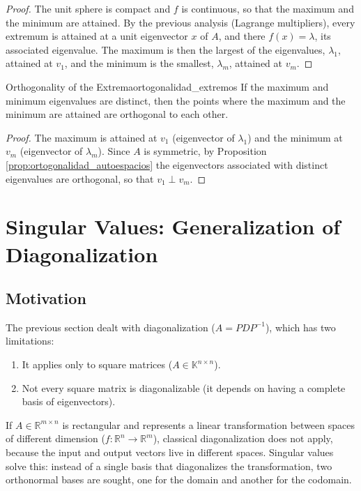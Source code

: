 \documentclass[11pt, a4paper]{article}
\begin{document}
\begin{proof}
The unit sphere is compact and $f$ is continuous, so that the maximum and the minimum are attained. By the previous analysis (Lagrange multipliers), every extremum is attained at a unit eigenvector $x$ of $A$, and there $f(x) = \lambda$, its associated eigenvalue. The maximum is then the largest of the eigenvalues, $\lambda_1$, attained at $v_1$, and the minimum is the smallest, $\lambda_m$, attained at $v_m$.
\end{proof}

\begin{corolario}{Orthogonality of the Extrema}{ortogonalidad_extremos}
If the maximum and minimum eigenvalues are distinct, then the points where the maximum and the minimum are attained are orthogonal to each other.
\end{corolario}

\begin{proof}
The maximum is attained at $v_1$ (eigenvector of $\lambda_1$) and the minimum at $v_m$ (eigenvector of $\lambda_m$). Since $A$ is symmetric, by Proposition \ref{prop:ortogonalidad_autoespacios} the eigenvectors associated with distinct eigenvalues are orthogonal, so that $v_1 \perp v_m$.
\end{proof}

\newpage

\section{Singular Values: Generalization of Diagonalization}

\subsection{Motivation}

The previous section dealt with diagonalization ($A = P D P^{-1}$), which has two limitations:
\begin{enumerate}
    \item It applies only to square matrices ($A \in \mathbb{K}^{n \times n}$).
    \item Not every square matrix is diagonalizable (it depends on having a complete basis of eigenvectors).
\end{enumerate}

If $A \in \mathbb{R}^{m \times n}$ is rectangular and represents a linear transformation between spaces of different dimension ($f: \mathbb{R}^n \to \mathbb{R}^m$), classical diagonalization does not apply, because the input and output vectors live in different spaces. Singular values solve this: instead of a single basis that diagonalizes the transformation, two orthonormal bases are sought, one for the domain and another for the codomain.
\end{document}
